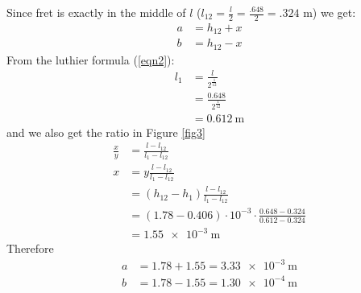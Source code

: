 Since fret  is exactly in the middle of $l$ ($l_{12} = \frac{l}{2} = \frac{.648}{2} = .324$ m) we get:
\begin{align*}
    a &= h_{12} + x \\
    b &= h_{12} - x
\end{align*}
From the luthier formula (\ref{eqn2}):
\begin{align*}
    l_1 &= \frac{l}{2^{\frac{1}{12}}} \\
        &= \frac{0.648}{2^{\frac{1}{12}}} \\
        &= \SI{0.612}{\meter}
\end{align*}
and we also get the ratio in Figure \ref{fig3}
\begin{align*}
    \frac{x}{y} &= \frac{l-l_{12}}{l_1-l_{12}} \\
    x &= y\frac{l-l_{12}}{l_1-l_{12}} \\
    &= (h_{12}-h_1)\frac{l-l_{12}}{l_1-l_{12}} \\
    &= (1.78-0.406) \cdot 10^{-3} \cdot \frac{0.648-0.324}{0.612-0.324} \\
    &= \SI{1.55e-3}{\meter}
\end{align*}
Therefore
\begin{align*}
    a &= 1.78 + 1.55 = \SI{3.33e-3}{\meter} \\
    b &= 1.78 - 1.55 = \SI{1.30e-4}{\meter}
\end{align*}    

